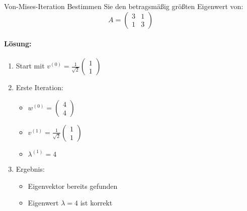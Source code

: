 \begin{example2}{Von-Mises-Iteration}
Bestimmen Sie den betragsmäßig größten Eigenwert von:
$$A = \begin{pmatrix}
3 & 1 \\
1 & 3
\end{pmatrix}$$

\paragraph{Lösung:}
\begin{enumerate}
    \item Start mit $v^{(0)} = \frac{1}{\sqrt{2}}\begin{pmatrix} 1 \\ 1 \end{pmatrix}$
    
    \item Erste Iteration:
    \begin{itemize}
        \item $w^{(0)} = \begin{pmatrix} 4 \\ 4 \end{pmatrix}$
        \item $v^{(1)} = \frac{1}{\sqrt{2}}\begin{pmatrix} 1 \\ 1 \end{pmatrix}$
        \item $\lambda^{(1)} = 4$
    \end{itemize}
    
    \item Ergebnis:
    \begin{itemize}
        \item Eigenvektor bereits gefunden
        \item Eigenwert $\lambda = 4$ ist korrekt
    \end{itemize}
\end{enumerate}
\end{example2}